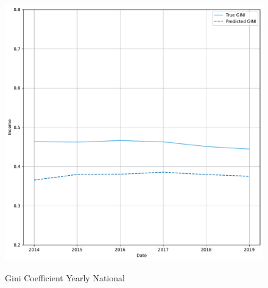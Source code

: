 \begin{figure}[H]
    \centering
    \caption{Gini Coefficient Yearly National}
    \includegraphics[width=\textwidth]{../figures/fig9_gini_time_series.pdf}
    \label{fig:enter-label}
\end{figure}

